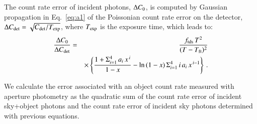 \documentclass{aa}
\begin{document}
The count rate error of incident photons, $\Delta C_{\rm 0}$, is
computed by Gaussian propagation in Eq.~\ref{eq:a1} of the Poissonian
count rate error on the detector, $\Delta C_{\rm det}=\sqrt{C_{\rm
det}/T_{\rm exp}}$, where $T_{\rm exp}$ is the exposure time, which
leads to:
\begin{eqnarray}
\frac{\Delta C_{\rm 0}}{\Delta C_{\rm det}} & = & \frac{f_\mathrm{tds} \, T^2}{(T-T_{\rm
ft})^2} \nonumber \\ 
& & \times \left\{ \frac{1 + \Sigma_{i=1}^4 \, a_i \, x^{\,i} }{1-x} -
\ln{(1-x)} \, \Sigma_{i=1}^4 \, i \, a_i \, x^{\,i-1} \right\} \,.
\end{eqnarray}

We calculate the error associated with an object count rate measured
with aperture photometry as the quadratic sum of the count rate error of
incident sky+object photons and the count rate error of incident sky
photons determined with previous equations.



\end{document}
